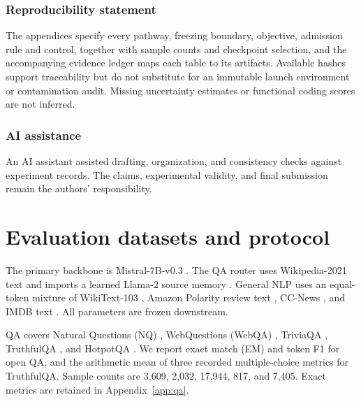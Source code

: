 \documentclass{article}
\begin{document}
\subsubsection*{Reproducibility statement}
The appendices specify every pathway, freezing boundary, objective, admission rule and control, together with sample counts and checkpoint selection, and the accompanying evidence ledger maps each table to its artifacts. Available hashes support traceability but do not substitute for an immutable launch environment or contamination audit. Missing uncertainty estimates or functional coding scores are not inferred.

\subsubsection*{AI assistance}
An AI assistant assisted drafting, organization, and consistency checks against experiment records. The claims, experimental validity, and final submission remain the authors' responsibility.


\clearpage
\appendix

\section{Evaluation datasets and protocol}\label{app:setup}

The primary backbone is Mistral-7B-v0.3 \citep{jiang2023mistral}. The QA router uses Wikipedia-2021 text and imports a learned Llama-2 source memory \citep{touvron2023llama}. General NLP uses an equal-token mixture of WikiText-103 \citep{merity2017pointer}, Amazon Polarity review text \citep{zhang2015character}, CC-News \citep{blagojevic2021ccnews}, and IMDB text \citep{maas2011learning}. All parameters are frozen downstream.

QA covers Natural Questions (NQ) \citep{kwiatkowski2019natural}, WebQuestions (WebQA) \citep{berant2013semantic}, TriviaQA \citep{joshi2017trivia}, TruthfulQA \citep{lin2022truthful}, and HotpotQA \citep{yang2018hotpot}. We report exact match (EM) and token F1 for open QA, and the arithmetic mean of three recorded multiple-choice metrics for TruthfulQA. Sample counts are 3,609, 2,032, 17,944, 817, and 7,405. Exact metrics are retained in Appendix~\ref{app:qa}.
\end{document}
